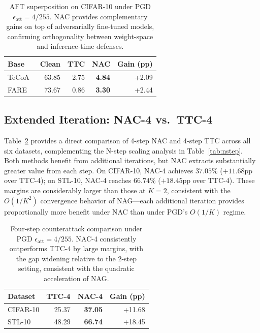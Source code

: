 \documentclass[pdflatex,sn-basic,Numbered]{sn-jnl}
\theoremstyle{thmstyleone}
\theoremstyle{thmstyletwo}
\theoremstyle{thmstylethree}
\begin{document}
\begin{table}[ht]\centering\small
\caption{AFT superposition on CIFAR-10 under PGD $\epsilon_{\text{att}}=4/255$. NAC provides complementary gains on top of adversarially fine-tuned models, confirming orthogonality between weight-space and inference-time defenses.}\label{tab:aft}
\begin{tabular}{@{}lrrrr@{}}
\toprule Base & Clean & TTC & NAC & Gain (pp) \\
\midrule TeCoA~\cite{mao2023understanding} & 63.85 & 2.75 & \textbf{4.84} & +2.09 \\
FARE~\cite{schlarmann2024robust} & 73.67 & 0.86 & \textbf{3.30} & +2.44 \\
\bottomrule
\end{tabular}
\end{table}

\subsection{Extended Iteration: NAC-4 vs.\ TTC-4}

Table~\ref{tab:nac4} provides a direct comparison of 4-step NAC and 4-step TTC across all six datasets, complementing the N-step scaling analysis in Table~\ref{tab:nstep}. Both methods benefit from additional iterations, but NAC extracts substantially greater value from each step. On CIFAR-10, NAC-4 achieves $37.05\%$ ($+11.68$pp over TTC-4); on STL-10, NAC-4 reaches $66.74\%$ ($+18.45$pp over TTC-4). These margins are considerably larger than those at $K=2$, consistent with the $O(1/K^2)$ convergence behavior of NAG---each additional iteration provides proportionally more benefit under NAC than under PGD's $O(1/K)$ regime.

\begin{table}[ht]\centering\small
\caption{Four-step counterattack comparison under PGD $\epsilon_{\text{att}}=4/255$. NAC-4 consistently outperforms TTC-4 by large margins, with the gap widening relative to the 2-step setting, consistent with the quadratic acceleration of NAG.}\label{tab:nac4}
\begin{tabular}{@{}lrrr@{}}
\toprule Dataset & TTC-4 & NAC-4 & Gain (pp) \\
\midrule CIFAR-10 & 25.37 & \textbf{37.05} & +11.68 \\
STL-10 & 48.29 & \textbf{66.74} & +18.45 \\
\bottomrule
\end{tabular}
\end{table}
\end{document}
